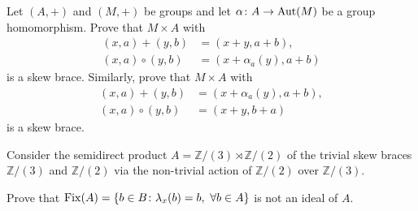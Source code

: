 \documentclass[12pt]{amsproc}
\begin{document}
\begin{xca}\label{ex:sd}
    	Let $(A,+)$ and $(M,+)$ be groups and let $\alpha\colon A\to\operatorname{Aut}(M)$ be a
    	group homomorphism. Prove that $M\times A$ with 
    	\begin{align*}
        	(x,a)+(y,b)&=(x+y,a+b),
        	\\
        	(x,a)\circ (y,b)&=(x+\alpha_a(y),a+b)
    	\end{align*}
    	is a skew brace. Similarly, prove that $M\times A$ with
    	\begin{align*}
        	(x,a)+(y,b)&=(x+\alpha_a(y),a+b),\\
        	(x,a)\circ (y,b)&=(x+y,b+a)
    	\end{align*}
    	is a skew brace. 
    \end{xca}

    


\begin{xca}\label{ex:fix}
    Consider the semidirect product $A= \mathbb{Z}/(3) \rtimes \mathbb{Z}/(2)$ of the trivial
    skew braces $\mathbb{Z}/(3)$ and $\mathbb{Z}/(2)$ via the non-trivial action of $\mathbb{Z}/(2)$ over $\mathbb{Z}/(3)$.
    
    Prove that $\operatorname{Fix}(A)=\{b \in B\colon \lambda_x(b)=b,\ \forall b\in A\}$ is not an ideal of $A$.
\end{xca}
\end{document}
